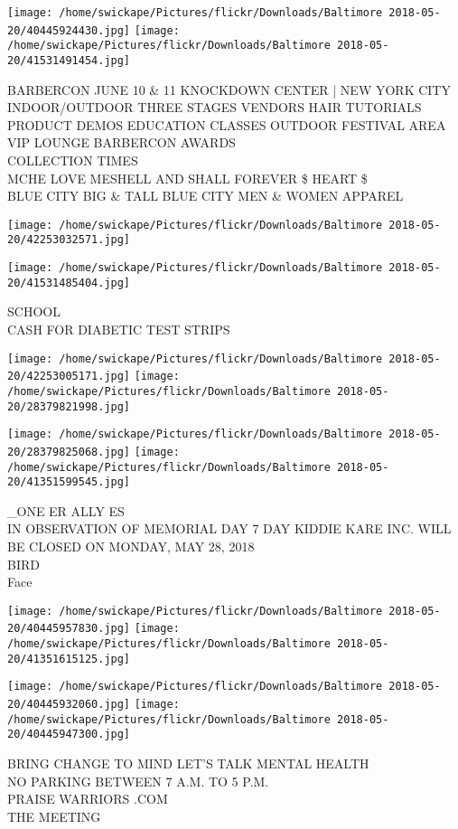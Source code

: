 \documentclass[10pt,letterpaper]{article}
\begin{document}
\texttt{[image: /home/swickape/Pictures/flickr/Downloads/Baltimore 2018-05-20/40445924430.jpg]}
\texttt{[image: /home/swickape/Pictures/flickr/Downloads/Baltimore 2018-05-20/41531491454.jpg]}

BARBERCON JUNE 10 \& 11 KNOCKDOWN CENTER | NEW YORK CITY INDOOR/OUTDOOR THREE STAGES VENDORS HAIR TUTORIALS PRODUCT DEMOS EDUCATION CLASSES OUTDOOR FESTIVAL AREA VIP LOUNGE BARBERCON AWARDS\\
COLLECTION TIMES\\
MCHE LOVE MESHELL AND SHALL FOREVER \$ HEART \$\\
BLUE CITY BIG \& TALL BLUE CITY MEN \& WOMEN APPAREL
\pagebreak

\texttt{[image: /home/swickape/Pictures/flickr/Downloads/Baltimore 2018-05-20/42253032571.jpg]}

\vspace{0.25in}
\texttt{[image: /home/swickape/Pictures/flickr/Downloads/Baltimore 2018-05-20/41531485404.jpg]}

SCHOOL\\
CASH FOR DIABETIC TEST STRIPS
\pagebreak

\texttt{[image: /home/swickape/Pictures/flickr/Downloads/Baltimore 2018-05-20/42253005171.jpg]}
\texttt{[image: /home/swickape/Pictures/flickr/Downloads/Baltimore 2018-05-20/28379821998.jpg]}

\texttt{[image: /home/swickape/Pictures/flickr/Downloads/Baltimore 2018-05-20/28379825068.jpg]}
\texttt{[image: /home/swickape/Pictures/flickr/Downloads/Baltimore 2018-05-20/41351599545.jpg]}

\_ONE ER ALLY ES\\
IN OBSERVATION OF MEMORIAL DAY 7 DAY KIDDIE KARE INC. WILL BE CLOSED ON MONDAY, MAY 28, 2018\\
BIRD\\
Face
\pagebreak

\texttt{[image: /home/swickape/Pictures/flickr/Downloads/Baltimore 2018-05-20/40445957830.jpg]}
\texttt{[image: /home/swickape/Pictures/flickr/Downloads/Baltimore 2018-05-20/41351615125.jpg]}

\texttt{[image: /home/swickape/Pictures/flickr/Downloads/Baltimore 2018-05-20/40445932060.jpg]}
\texttt{[image: /home/swickape/Pictures/flickr/Downloads/Baltimore 2018-05-20/40445947300.jpg]}

BRING CHANGE TO MIND LET'S TALK MENTAL HEALTH\\
NO PARKING BETWEEN 7 A.M. TO 5 P.M.\\
PRAISE WARRIORS .COM\\
THE MEETING
\pagebreak
\end{document}
